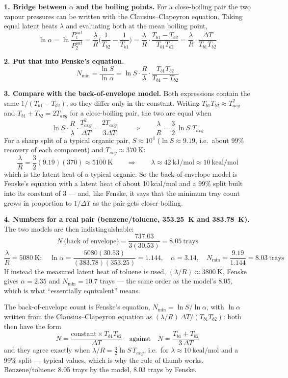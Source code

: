\documentclass[10pt,a4paper]{article}
\newcommand{\spsub}[1]{\par\addvspace{7pt}\noindent{\color{accent}\bfseries #1}\par\addvspace{3pt}\nopagebreak}
\begin{document}
\spsub{Solution}
\textbf{1. Bridge between $\alpha$ and the boiling points.} For a close-boiling pair the two vapour
pressures can be written with the Clausius--Clapeyron equation. Taking equal latent heats
$\lambda$ and evaluating both at the mean boiling point,
\[
\ln\alpha=\ln\frac{P_1^{sat}}{P_2^{sat}}
=\frac{\lambda}{R}\Big(\frac{1}{T_{b2}}-\frac{1}{T_{b1}}\Big)
=\frac{\lambda}{R}\cdot\frac{T_{b1}-T_{b2}}{T_{b1}T_{b2}}
=\frac{\lambda}{R}\cdot\frac{\Delta T}{T_{b1}T_{b2}}
\]

\textbf{2. Put that into Fenske's equation.}
\[
N_{\min}=\frac{\ln S}{\ln\alpha}
=\ln S\cdot\frac{R}{\lambda}\cdot\frac{T_{b1}T_{b2}}{T_{b1}-T_{b2}}
\]

\textbf{3. Compare with the back-of-envelope model.} Both expressions contain the same
$1/(T_{b1}-T_{b2})$, so they differ only in the constant. Writing $T_{b1}T_{b2}\approx T_{avg}^2$
and $T_{b1}+T_{b2}=2T_{avg}$ for a close-boiling pair, the two are equal when
\[
\ln S\cdot\frac{R}{\lambda}\cdot\frac{T_{avg}^2}{\Delta T}
=\frac{2T_{avg}}{3\Delta T}
\qquad\Longrightarrow\qquad
\frac{\lambda}{R}=\frac{3}{2}\,\ln S\;T_{avg}
\]
For a sharp split of a typical organic pair, $S\approx10^4$ ($\ln S\approx9.19$, i.e.\ about 99\%
recovery of each component) and $T_{avg}\approx\SI{370}{\kelvin}$:
\[
\frac{\lambda}{R}=\frac{3}{2}(9.19)(370)\approx\SI{5100}{\kelvin}
\qquad\Longrightarrow\qquad
\lambda\approx\SI{42}{\kilo\joule\per\mole}\approx 10\ \text{kcal/mol}
\]
which is the latent heat of a typical organic. So the back-of-envelope model is Fenske's equation
with a latent heat of about 10\,kcal/mol and a 99\% split built into its
constant of 3 --- and, like Fenske, it says that the minimum tray count grows in proportion to
$1/\Delta T$ as the pair gets closer-boiling.

\textbf{4. Numbers for a real pair (benzene/toluene, \SI{353.25}{\kelvin} and \SI{383.78}{\kelvin}).}
The two models are then indistinguishable:
\[
N\ \text{(back of envelope)}=\frac{737.03}{3(30.53)}=8.05\ \text{trays}
\]
\[
\frac{\lambda}{R}=\SI{5080}{\kelvin}:\quad
\ln\alpha=\frac{5080(30.53)}{(383.78)(353.25)}=1.144,\quad
\alpha=3.14,\quad
N_{\min}=\frac{9.19}{1.144}=8.03\ \text{trays}
\]
If instead the measured latent heat of toluene is used, $(\lambda/R)\approx\SI{3800}{\kelvin}$,
Fenske gives $\alpha=2.35$ and $N_{\min}=10.7$ trays --- the same order as the model's 8.05, which
is what ``essentially equivalent'' means.

\begin{ansbox}
The back-of-envelope count is Fenske's equation,
$N_{\min}=\ln S/\ln\alpha$, with $\ln\alpha$ written from the Clausius--Clapeyron equation as
$(\lambda/R)\,\Delta T/(T_{b1}T_{b2})$: both then have the form
\[
N=\frac{\text{constant}\times T_{b1}T_{b2}}{\Delta T}
\quad\text{against}\quad
N=\frac{T_{b1}+T_{b2}}{3\,\Delta T}
\]
and they agree exactly when $\lambda/R=\tfrac32\ln S\,T_{avg}$, i.e.\ for
$\lambda\approx 10\ \text{kcal/mol}$ and a 99\% split --- typical values, which is why the
rule of thumb works. Benzene/toluene: 8.05 trays by the model, 8.03 trays by Fenske.
\end{ansbox}
\end{document}
